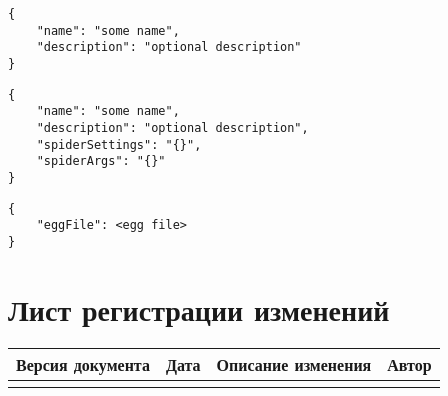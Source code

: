 \documentclass[a4paper,12pt]{article}
\begin{document}


\begin{lstlisting}[frame=single, basicstyle=\footnotesize\ttfamily, label={lst:POST}, caption={JSON for POST /projects},captionpos=b]
{
    "name": "some name",
    "description": "optional description"
}
\end{lstlisting}


\begin{lstlisting}[frame=single, basicstyle=\footnotesize\ttfamily, label={lst:PUT}, caption={JSON for PUT /project},captionpos=b]
{
    "name": "some name",
    "description": "optional description",
    "spiderSettings": "{}",
    "spiderArgs": "{}"
}
\end{lstlisting}


\begin{lstlisting}[frame=single, basicstyle=\footnotesize\ttfamily, label={lst:DEPLOY}, caption={JSON for PUT /deploy},captionpos=b]
{
    "eggFile": <egg file>
}
\end{lstlisting}
\clearpage
\section{Лист регистрации изменений}

\begin{longtable}[]{|l|l|l|l|} \hline
    Версия документа & Дата & Описание изменения & Автор \\ \hline
                     &      &                    &       \\ \hline
\end{longtable}
\end{document}
